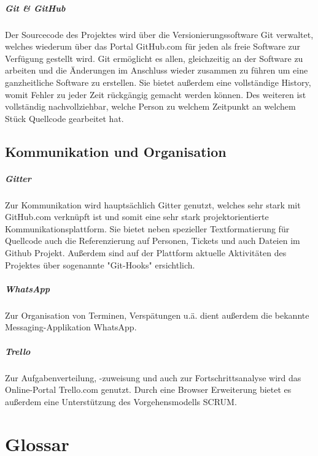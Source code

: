 \documentclass[11pt]{report}
\begin{document}
\paragraph{Git \& GitHub}
Der Sourcecode des Projektes wird über die Versionierungssoftware Git verwaltet, welches wiederum über das Portal GitHub.com für jeden als freie Software zur Verf\"ugung gestellt wird.
Git ermöglicht es allen, gleichzeitig an der Software zu arbeiten und die \"Anderungen im Anschluss wieder zusammen zu f\"uhren um eine ganzheitliche Software zu erstellen. Sie bietet außerdem eine vollst\"andige History, womit Fehler zu jeder Zeit r\"uckg\"angig gemacht werden k\"onnen.
Des weiteren ist vollst\"andig nachvollziehbar, welche Person zu welchem Zeitpunkt an welchem St\"uck Quellcode gearbeitet hat.

\section{Kommunikation und Organisation}
\paragraph{Gitter}
Zur Kommunikation wird haupts\"achlich Gitter genutzt, welches sehr stark mit GitHub.com verkn\"upft ist und somit eine sehr stark projektorientierte Kommunikationsplattform. Sie bietet neben spezieller Textformatierung f\"ur Quellcode auch die Referenzierung auf Personen, Tickets und auch Dateien im Github Projekt. Außerdem sind auf der Plattform aktuelle Aktivit\"aten des Projektes \"uber sogenannte "Git-Hooks" ersichtlich.
\paragraph{WhatsApp}
Zur Organisation von Terminen, Versp\"atungen u.ä. dient außerdem die bekannte Messaging-Applikation WhatsApp.
\paragraph{Trello}
Zur Aufgabenverteilung, -zuweisung und auch zur Fortschrittsanalyse wird das Online-Portal Trello.com genutzt. Durch eine Browser Erweiterung bietet es außerdem eine Unterstützung des Vorgehensmodells SCRUM.

\chapter{Glossar}
\end{document}
